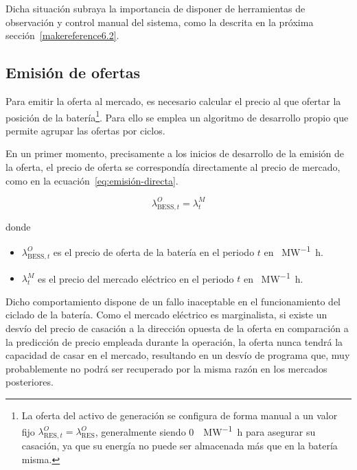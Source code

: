 Dicha situación subraya la importancia de disponer de herramientas de observación y control manual del sistema, como la descrita en la próxima sección~\ref{makereference6.2}.

\subsection{Emisión de ofertas}
\label{makereference6.1.2}

Para emitir la oferta al mercado, es necesario calcular el precio al que ofertar la posición de la batería\footnote{La oferta del activo de generación se configura de forma manual a un valor fijo \( \lambda^{O}_{\text{RES}, t} = \lambda^{O}_{\text{RES}} \), generalmente siendo \SI{0}{\text{\euro}\per\mega\watt\hour} para asegurar su casación, ya que su energía no puede ser almacenada más que en la batería misma.}. Para ello se emplea un algoritmo de desarrollo propio que permite agrupar las ofertas por ciclos.

En un primer momento, precisamente a los inicios de desarrollo de la emisión de la oferta, el precio de oferta se correspondía directamente al precio de mercado, como en la ecuación~\ref{eq:emisión-directa}.

\begin{samepage}

  \begin{equation}
    \label{eq:emisión-directa}
    \lambda^{O}_{\text{BESS}, t} = \lambda^{M}_{t}
  \end{equation}

  donde

  \begin{itemize}

    \item \( \lambda^{O}_{\text{BESS}, t} \) es el precio de oferta de la batería en el periodo \( t \) en \si{\text{\euro}\per\mega\watt\hour}.

    \item \( \lambda^{M}_{t} \) es el precio del mercado eléctrico en el periodo \( t \) en \si{\text{\euro}\per\mega\watt\hour}.

  \end{itemize}

\end{samepage}

Dicho comportamiento dispone de un fallo inaceptable en el funcionamiento del ciclado de la batería. Como el mercado eléctrico es marginalista, si existe un desvío del precio de casación a la dirección opuesta de la oferta en comparación a la predicción de precio empleada durante la operación, la oferta nunca tendrá la capacidad de casar en el mercado, resultando en un desvío de programa que, muy probablemente no podrá ser recuperado por la misma razón en los mercados posteriores.

